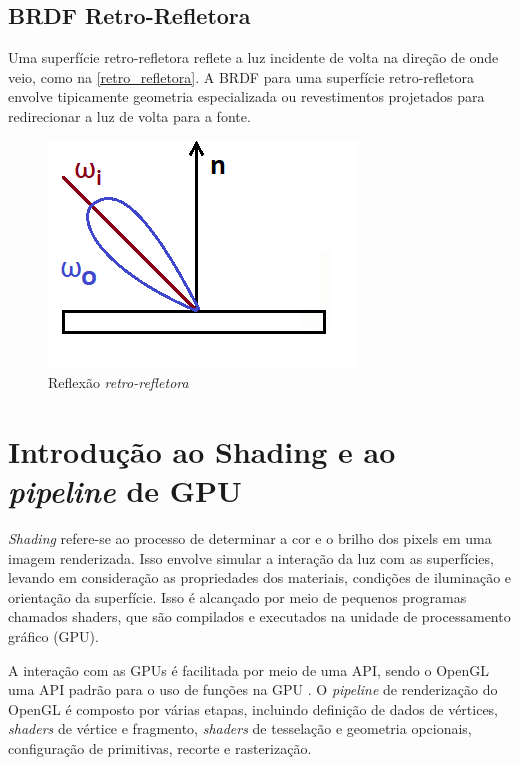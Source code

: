 \documentclass[english, 
               brazil, 
               bsc] %
               {dcomp-abntex2}
\begin{document}
\subsection{BRDF Retro-Refletora}
Uma superfície retro-refletora reflete a luz incidente de volta na direção de onde veio, como na \autoref{retro_refletora}. A BRDF para uma superfície retro-refletora envolve tipicamente geometria especializada ou revestimentos projetados para redirecionar a luz de volta para a fonte.

\begin{figure}[H]
  \caption{\label{retro_refletora} \small Reflexão \textit{retro-refletora}}
	\begin{center}
	    \includegraphics[scale=0.5]{./Imagens/retro-reflection-2d.png}
	\end{center}
\end{figure}


\section{Introdução ao Shading e ao \textit{pipeline} de GPU} \label{shading}

\textit{Shading} refere-se ao processo de determinar a cor e o brilho dos pixels em uma imagem renderizada. Isso envolve simular a interação da luz com as superfícies, levando em consideração as propriedades dos materiais, condições de iluminação e orientação da superfície. Isso é alcançado por meio de pequenos programas chamados shaders, que são compilados e executados na unidade de processamento gráfico (GPU).


A interação com as GPUs é facilitada por meio de uma 
API, sendo o OpenGL uma API padrão para o uso de funções na GPU \cite{opengl_spec}. O \textit{pipeline} de renderização do OpenGL é composto por várias etapas, incluindo definição de dados de vértices, \textit{shaders} de vértice e fragmento, \textit{shaders} de tesselação e geometria opcionais, configuração de primitivas, recorte e rasterização.
\end{document}

